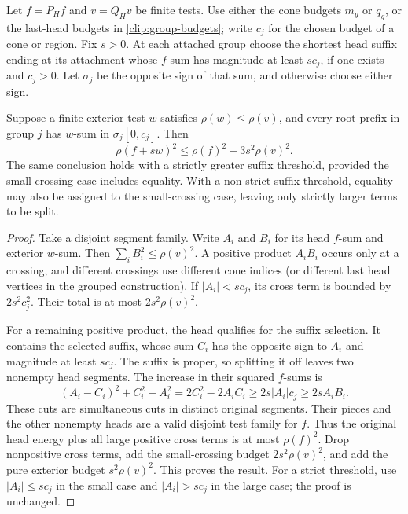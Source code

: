 \begin{lemma}\label{clip:crossing}
Let $f=P_Hf$ and $v=Q_Hv$ be finite tests. Use either the cone budgets
$m_g$ or $q_g$, or the last-head budgets in
\eqref{clip:group-budgets}; write $c_j$ for the chosen budget of a
cone or region. Fix $s>0$. At each attached group choose the shortest
head suffix ending at its attachment whose $f$-sum has magnitude at
least $sc_j$, if one exists and $c_j>0$. Let $\sigma_j$ be the
opposite sign of that sum, and otherwise choose either sign.

Suppose a finite exterior test $w$ satisfies
$\rho(w)\le\rho(v)$, and every root prefix in group $j$ has
$w$-sum in $\sigma_j[0,c_j]$. Then
\begin{equation}\label{clip:crossing-bound}
 \rho(f+sw)^2\le\rho(f)^2+3s^2\rho(v)^2.
\end{equation}
The same conclusion holds with a strictly greater suffix threshold,
provided the small-crossing case includes equality. With a non-strict
suffix threshold, equality may also be assigned to the small-crossing
case, leaving only strictly larger terms to be split.
\end{lemma}
\begin{proof}
Take a disjoint segment family. Write $A_i$ and $B_i$ for its head
$f$-sum and exterior $w$-sum. Then
$\sum_iB_i^2\le\rho(v)^2$. A positive product $A_iB_i$ occurs
only at a crossing, and different crossings use different cone indices
(or different last head vertices in the grouped construction).
If $|A_i|<sc_j$, its cross term is bounded by $2s^2c_j^2$.
Their total is at most $2s^2\rho(v)^2$.

For a remaining positive product, the head qualifies for the suffix
selection. It contains the selected suffix, whose sum $C_i$ has the
opposite sign to $A_i$ and magnitude at least $sc_j$. The suffix is
proper, so splitting it off leaves two nonempty head segments. The
increase in their squared $f$-sums is
\begin{equation}\label{clip:split-gain}
 (A_i-C_i)^2+C_i^2-A_i^2
 =2C_i^2-2A_iC_i\ge2s|A_i|c_j\ge2sA_iB_i.
\end{equation}
These cuts are simultaneous cuts in distinct original segments.
Their pieces and the other nonempty heads are a valid disjoint test
family for $f$. Thus the original head energy plus all large positive
cross terms is at most $\rho(f)^2$. Drop nonpositive cross terms,
add the small-crossing budget $2s^2\rho(v)^2$, and add the pure
exterior budget $s^2\rho(v)^2$. This proves the result.
For a strict threshold, use $|A_i|\le sc_j$ in the small case and
$|A_i|>sc_j$ in the large case; the proof is unchanged.
\end{proof}

